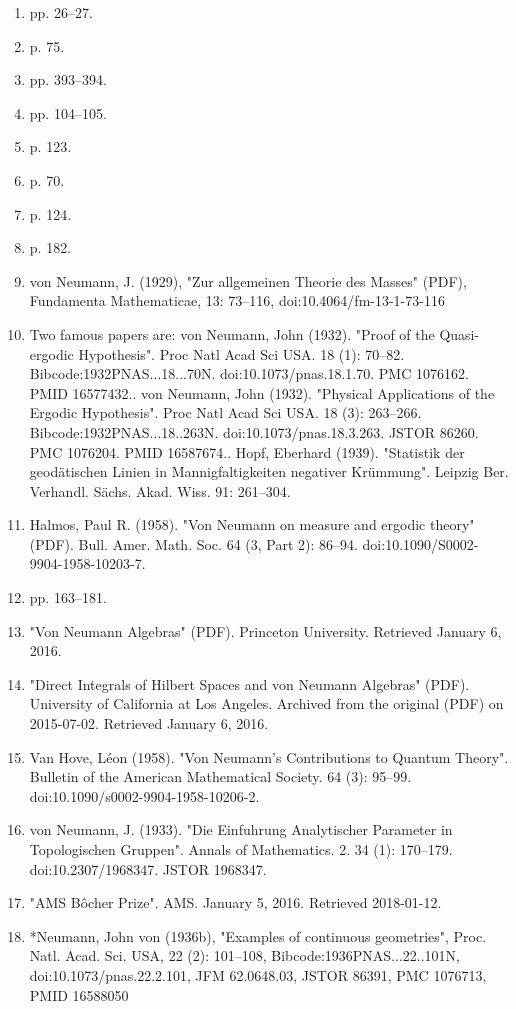 \begin{enumerate}
\item  pp. 26–27.
\item  p. 75.
\item  pp. 393–394.
\item  pp. 104–105.
\item  p. 123.
\item  p. 70.
\item  p. 124.
\item  p. 182.
\item von Neumann, J. (1929), "Zur allgemeinen Theorie des Masses" (PDF), Fundamenta Mathematicae, 13: 73–116, doi:10.4064/fm-13-1-73-116
\item Two famous papers are: von Neumann, John (1932). "Proof of the Quasi-ergodic Hypothesis". Proc Natl Acad Sci USA. 18 (1): 70–82. Bibcode:1932PNAS...18...70N. doi:10.1073/pnas.18.1.70. PMC 1076162. PMID 16577432.. von Neumann, John (1932). "Physical Applications of the Ergodic Hypothesis". Proc Natl Acad Sci USA. 18 (3): 263–266. Bibcode:1932PNAS...18..263N. doi:10.1073/pnas.18.3.263. JSTOR 86260. PMC 1076204. PMID 16587674.. Hopf, Eberhard (1939). "Statistik der geodätischen Linien in Mannigfaltigkeiten negativer Krümmung". Leipzig Ber. Verhandl. Sächs. Akad. Wiss. 91: 261–304.
\item Halmos, Paul R. (1958). "Von Neumann on measure and ergodic theory" (PDF). Bull. Amer. Math. Soc. 64 (3, Part 2): 86–94. doi:10.1090/S0002-9904-1958-10203-7.
\item  pp. 163–181.
\item "Von Neumann Algebras" (PDF). Princeton University. Retrieved January 6, 2016.
\item "Direct Integrals of Hilbert Spaces and von Neumann Algebras" (PDF). University of California at Los Angeles. Archived from the original (PDF) on 2015-07-02. Retrieved January 6, 2016.
\item Van Hove, Léon (1958). "Von Neumann's Contributions to Quantum Theory". Bulletin of the American Mathematical Society. 64 (3): 95–99. doi:10.1090/s0002-9904-1958-10206-2.
\item von Neumann, J. (1933). "Die Einfuhrung Analytischer Parameter in Topologischen Gruppen". Annals of Mathematics. 2. 34 (1): 170–179. doi:10.2307/1968347. JSTOR 1968347.
\item "AMS Bôcher Prize". AMS. January 5, 2016. Retrieved 2018-01-12.
\item *Neumann, John von (1936b), "Examples of continuous geometries", Proc. Natl. Acad. Sci. USA, 22 (2): 101–108, Bibcode:1936PNAS...22..101N, doi:10.1073/pnas.22.2.101, JFM 62.0648.03, JSTOR 86391, PMC 1076713, PMID 16588050

\end{enumerate}
